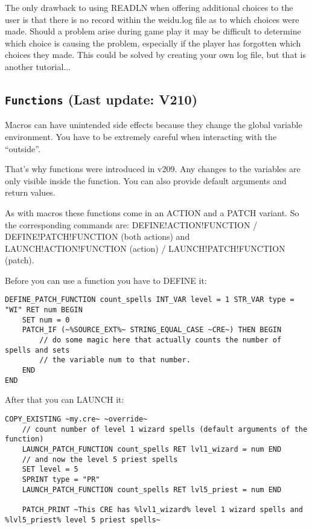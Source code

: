 \documentclass{article}
\def\DEFINE#1{{\tt \bf #1}\label{#1}\index{#1}}
\begin{document}
The only drawback to using READLN when offering additional choices to the user is
that there is no record within the weidu.log file as to which choices were made.
Should a problem arise during game play it may be difficult to determine which choice
is causing the problem, especially if the player has forgotten which choices they made.
This could be solved by creating your own log file, but that is another tutorial...

\subsection{\DEFINE{Functions} (Last update: V210)}

Macros can have unintended side effects because they change the global variable environment.
You have to be extremely careful when interacting with the ``outside''.

That's why functions were introduced in v209. Any changes to the variables are only visible
inside the function. You can also provide default arguments and return values.

As with macros these functions come in an ACTION and a PATCH variant. So the corresponding
commands are: DEFINE!ACTION!FUNCTION / DEFINE!PATCH!FUNCTION (both actions) and
LAUNCH!ACTION!FUNCTION (action) / LAUNCH!PATCH!FUNCTION (patch).

Before you can use a function you have to DEFINE it:
\begin{verbatim}
DEFINE_PATCH_FUNCTION count_spells INT_VAR level = 1 STR_VAR type = "WI" RET num BEGIN
    SET num = 0
    PATCH_IF (~%SOURCE_EXT%~ STRING_EQUAL_CASE ~CRE~) THEN BEGIN
        // do some magic here that actually counts the number of spells and sets
        // the variable num to that number.
    END
END
\end{verbatim}

After that you can LAUNCH it:
\begin{verbatim}
COPY_EXISTING ~my.cre~ ~override~
    // count number of level 1 wizard spells (default arguments of the function)
    LAUNCH_PATCH_FUNCTION count_spells RET lvl1_wizard = num END
    // and now the level 5 priest spells
    SET level = 5
    SPRINT type = "PR"
    LAUNCH_PATCH_FUNCTION count_spells RET lvl5_priest = num END

    PATCH_PRINT ~This CRE has %lvl1_wizard% level 1 wizard spells and %lvl5_priest% level 5 priest spells~
\end{verbatim}
\end{document}
